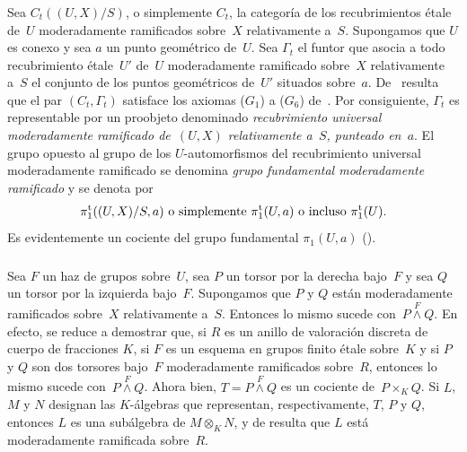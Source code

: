 \subsubsection{}
\label{XIII.2.1.3}
Sea $C_t((U,X)/S)$, o simplemente $C_t$,
\label{indnot:me}%
la categoría de los recubrimientos étale de~$U$ moderadamente ramificados
sobre~$X$ relativamente a~$S$. Supongamos que $U$ es conexo y sea $a$ un
punto geométrico de~$U$. Sea $\Gamma_t$ el funtor que asocia a todo
recubrimiento étale~$U'$ de~$U$ moderadamente ramificado sobre~$X$
relativamente a~$S$ el conjunto de los puntos geométricos de~$U'$ situados
sobre~$a$. De~ resulta que el par $(C_t,\Gamma_t)$ satisface
los axiomas ($G_1$) a ($G_6$) de~. Por consiguiente, $\Gamma_t$
es representable por un proobjeto denominado \emph{recubrimiento universal
moderadamente ramificado
de~$(U,X)$ relativamente a~$S$, punteado en~$a$}.
%
%
El grupo opuesto al grupo de los $U$-automorfismos del recubrimiento universal
moderadamente ramificado se denomina \emph{grupo fundamental moderadamente
ramificado}
%
%
y se denota por
$$
\pi_1^{\mathrm{t}}((U,X)/S,a)\text{ o simplemente }\pi_1^{\mathrm{t}}(U,a)\text{ o
incluso }\pi_1^{\mathrm{t}}(U).
$$
\label{indnot:mf}%
Es evidentemente un cociente del grupo fundamental $\pi_1(U,a)$
().

\subsubsection{}
\label{XIII.2.1.4}
Sea $F$ un haz de grupos sobre~$U$, sea $P$ un torsor por la derecha bajo~$F$
y sea $Q$ un torsor por la izquierda bajo~$F$. Supongamos que $P$ y $Q$ están
moderadamente ramificados sobre~$X$ relativamente a~$S$. Entonces lo mismo
sucede con~$P\stackrel{F}{\wedge}Q$. En efecto, se reduce a demostrar que,
si $R$ es un anillo de valoración discreta de cuerpo de fracciones $K$, si
$F$ es un esquema en grupos finito étale sobre~$K$ y si $P$ y $Q$ son dos
torsores bajo~$F$ moderadamente ramificados sobre~$R$, entonces lo mismo
sucede con~$P\stackrel{F}{\wedge}Q$. Ahora bien,
$T=P\stackrel{F}{\wedge}Q$ es un cociente de~$P\times_KQ$. Si $L$, $M$ y
$N$ designan las $K$-álgebras que representan, respectivamente, $T$, $P$ y
$Q$, entonces $L$ es una subálgebra de $M\otimes_KN$, y de
 resulta que $L$ está moderadamente ramificada sobre~$R$.

